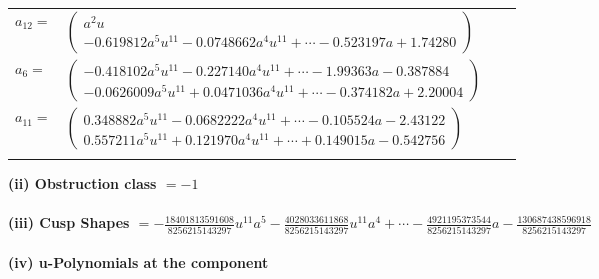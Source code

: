 \documentclass[1p]{elsarticle_modified}
\theoremstyle{definition}
\begin{document}
\begin{tabular}{m{7pt} m{180pt} m{7pt} m{180pt} }
\flushright $a_{12}=$&$\begin{pmatrix}a^2 u\\-0.619812 a^{5} u^{11}-0.0748662 a^{4} u^{11}+\cdots-0.523197 a+1.74280\end{pmatrix}$ \\
\flushright $a_{6}=$&$\begin{pmatrix}-0.418102 a^{5} u^{11}-0.227140 a^{4} u^{11}+\cdots-1.99363 a-0.387884\\-0.0626009 a^{5} u^{11}+0.0471036 a^{4} u^{11}+\cdots-0.374182 a+2.20004\end{pmatrix}$ \\
\flushright $a_{11}=$&$\begin{pmatrix}0.348882 a^{5} u^{11}-0.0682222 a^{4} u^{11}+\cdots-0.105524 a-2.43122\\0.557211 a^{5} u^{11}+0.121970 a^{4} u^{11}+\cdots+0.149015 a-0.542756\end{pmatrix}$\\&\end{tabular}
\flushleft \textbf{(ii) Obstruction class $= -1$}\\~\\
\flushleft \textbf{(iii) Cusp Shapes $= -\frac{18401813591608}{8256215143297} u^{11} a^5-\frac{4028033611868}{8256215143297} u^{11} a^4+\cdots-\frac{4921195373544}{8256215143297} a-\frac{130687438596918}{8256215143297}$}\\~\\
\newpage\renewcommand{\arraystretch}{1}
\flushleft \textbf{(iv) u-Polynomials at the component}\newline \\
\end{document}
